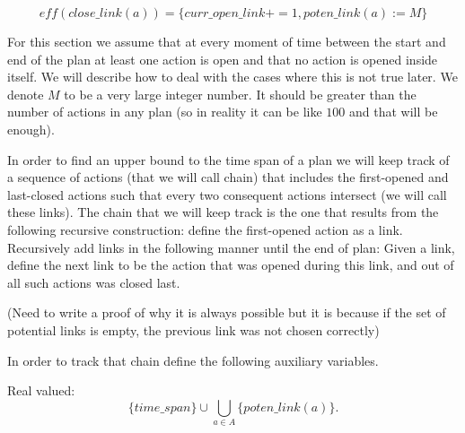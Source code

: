 \documentclass{article}
\begin{document}


$$eff(close\_link(a)) = \{curr\_open\_link += 1, poten\_link(a):=M\}$$






For this section we assume that at every moment of time between the start and end of the plan at least one action is open and that no action is opened inside itself. We will describe how to deal with the cases where this is not true later. We denote $M$ to be a very large integer number. It should be greater than the number of actions in any plan (so in reality it can be like $100$ and that will be enough). 

In order to find an upper bound to the time span of a plan we will keep track of a sequence of actions (that we will call chain) that includes the first-opened and last-closed actions such that every two consequent actions intersect (we will call these links). The chain that we will keep track is the one that results from the following recursive construction: define the first-opened action as a link. Recursively add links in the following manner until the end of plan: Given a link, define the next link to be the action that was opened during this link, and out of all such actions was closed last.

(Need to write a proof of why it is always possible but it is because if the set of potential links is empty, the previous link was not chosen correctly)

In order to track that chain define the following auxiliary variables.

Real valued:
\[
\{time\_span\}\cup \bigcup_{a\in A}\{ poten\_link(a)\}.
\]
\end{document}

